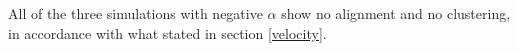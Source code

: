 \documentclass[../../master_thesis_np.tex]{subfiles}
\begin{document}
		All of the three simulations with negative $\alpha$ show no alignment and no clustering, in accordance with what stated in section \ref{velocity}.
		
		\begin{figure}[hbtp]
			\centering\
			\\
			\\

\end{figure}
\end{document}
